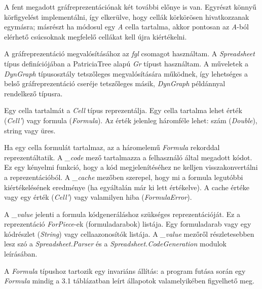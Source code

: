 A fent megadott gráfreprezentációnak két további előnye is van. Egyrészt könnyű körfigyelést implementálni, így elkerülve, hogy cellák körkörösen hivatkozzanak egymásra; másrészt ha módosul egy \textit{A} cella tartalma, akkor pontosan az \textit{A}-ból elérhető csúcsoknak megfelelő cellákat kell újra kiértékelni.

A gráfreprezentáció megvalósításához az \textit{fgl} csomagot használtam. A \textit{Spreadsheet} típus definíciójában a PatriciaTree alapú \textit{Gr} típust használtam. A műveletek a \textit{DynGraph} típusosztály tetszőleges megvalósítására működnek, így lehetséges a belső gráfreprezentáció cseréje tetszőleges másik, \textit{DynGraph} példánnyal rendelkező típusra.

Egy cella tartalmát a \textit{Cell} típus reprezentálja. Egy cella tartalma lehet érték (\textit{Cell'}) vagy formula (\textit{Formula}). Az érték jelenleg háromféle lehet: szám (\textit{Double}), string vagy üres.

Ha egy cella formulát tartalmaz, az a háromelemű \textit{Formula} rekorddal reprezentáltatik. A \textit{\_code} mező tartalmazza a felhasználó által megadott kódot. Ez egy kényelmi funkció, hogy a kód megjelenítéséhez ne kelljen visszakonvertálni a reprezentációból. A \textit{\_cache} mezőben szerepel, hogy mi a formula legutóbbi kiértékelésének eredménye (ha egyáltalán már ki lett értékelve). A cache értéke vagy egy érték (\textit{Cell'}) vagy valamilyen hiba (\textit{FormulaError}). 

A \textit{\_value} jelenti a formula kódgeneráláshoz szükséges reprezentációját.  Ez a reprezentáció \textit{ForPiece}-ek (formuladarabok) listája. Egy formuladarab vagy egy kódrészlet (\textit{String}) vagy cellaazonosítók listája. A \textit{\_value} mezőről részletesebben lesz szó a \textit{Spreadsheet.Parser} és a \textit{Spreadsheet.CodeGeneration} modulok leírásában. 

A \textit{Formula} típushoz tartozik egy invariáns állítás: a program futása során egy \textit{Formula} mindig a 3.1 táblázatban leírt állapotok valamelyikében figyelhető meg.


